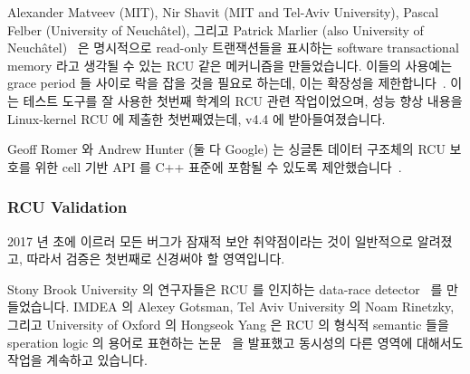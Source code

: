 Alexander Matveev (MIT), Nir Shavit (MIT and Tel-Aviv University),
Pascal Felber (University of Neuch\^{a}tel), 그리고 Patrick Marlier (also
University of Neuch\^{a}tel)~\cite{Matveev:2015:RLS:2815400.2815406}
은 명시적으로 read-only 트랜잭션들을 표시하는 software transactional memory
라고 생각될 수 있는 RCU 같은 메커니즘을 만들었습니다.
이들의 사용예는 grace period 들 사이로 락을 잡을 것을 필요로 하는데, 이는
확장성을
제한합니다~\cite{PaulEMcKenney2015ReadMostly,PaulEMcKenney2015ReadMostlySidebar}.
이는  테스트 도구를 잘 사용한 첫번째 학계의 RCU 관련
작업이었으며, 성능 향상 내용을 Linux-kernel RCU 에 제출한 첫번째였는데, v4.4 에
받아들여졌습니다.

Geoff Romer 와 Andrew Hunter (둘 다 Google) 는 싱글톤 데이터 구조체의 RCU
보호를 위한 cell 기반 API 를 C++ 표준에 포함될 수 있도록
제안했습니다~\cite{GeoffRomer2017C++DeferredReclamation}.
\iffalse

Alexander Matveev (MIT), Nir Shavit (MIT and Tel-Aviv University),
Pascal Felber (University of Neuch\^{a}tel), and Patrick Marlier (also
University of Neuch\^{a}tel)~\cite{Matveev:2015:RLS:2815400.2815406}
produced an RCU-like mechanism that can be thought of as
software transactional memory that explicitly marks
read-only transactions.
Their use cases require holding locks across grace periods, which limits
scalability~\cite{PaulEMcKenney2015ReadMostly,PaulEMcKenney2015ReadMostlySidebar}.
This appears to be the first academic RCU-related work to
make good use of the \co{rcutorture} test suite, and also the
first to have submitted a performance improvement to Linux-kernel
RCU, which was accepted into v4.4.

Geoff Romer and Andrew Hunter (both at Google) proposed a cell-based API for RCU
protection of singleton data structures for inclusion in the
C++ standard~\cite{GeoffRomer2017C++DeferredReclamation}.
\fi

\subsubsection{RCU Validation}
\label{sec:defer:RCU Validation}

2017 년 초에 이르러 모든 버그가 잠재적 보안 취약점이라는 것이 일반적으로
알려졌고, 따라서 검증은 첫번째로 신경써야 할 영역입니다.

Stony Brook University 의 연구자들은 RCU 를 인지하는 data-race
detector~\cite{AbhinavDuggal2010Masters,JustinSeyster2012PhD,Seyster:2011:RFA:2075416.2075425}
를 만들었습니다.
IMDEA 의 Alexey Gotsman, Tel Aviv University 의 Noam Rinetzky, 그리고
University of Oxford 의 Hongseok Yang 은 RCU 의 형식적 semantic 들을 speration
logic 의 용어로 표현하는 논문~\cite{AlexeyGotsman2012VerifyGraceExtended} 을
발표했고 동시성의 다른 영역에 대해서도 작업을 계속하고 있습니다.
\iffalse

